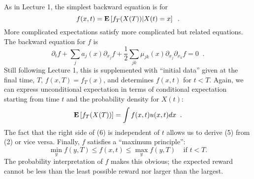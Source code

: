 As in Lecture 1, the simplest backward equation is for
\begin{displaymath}
f(x,t) = \mbox{\bf E}\left[ f_T(X(T)) | X(t) = x \right] \;\; .
\end{displaymath}
More complicated expectations satisfy more complicated but related
equations.  The backward equation for $f$ is
\begin{equation}
\partial_t f + \sum_j a_j(x) \partial_{x_j} f
         + \frac{1}{2} \sum_{jk} \mu_{jk}(x) \partial_{x_j}\partial_{x_k} f
            = 0 \;\; .
\end{equation}
Still following Lecture 1, this is supplemented with ``initial data'' given
at the final time, $T$, $f(x,T) = f_T(x)$, and determines $f(x,t)$ for
$t < T$.  Again, we can express unconditional expectation in terms of
conditional expectation starting from time $t$ and the probability density
for $X(t)$:
\begin{equation}
\mbox{\bf E}\left[ f_T(X(T)) \right] = \int f(x,t)u(x,t)dx \;\; .
\end{equation}
The fact that the right side of (6) is independent of $t$ allows us to
derive (5) from (2) or vice versa.  Finally, $f$ satisfies a
``maximum principle'':
\begin{displaymath}
\min_y f(y,T) \leq f(x,t) \leq \max_y f(y,T) \;\;\;\;
         \mbox{if $t < T$.}
\end{displaymath}
The probability interpretation of $f$ makes this obvious; the expected
reward cannot be less than the least possible reward nor larger than the
largest.
 